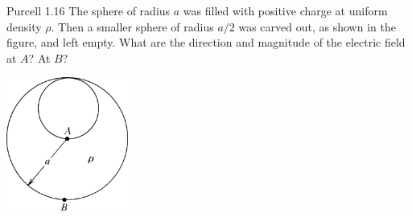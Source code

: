 \documentclass{esg8022pset}
\begin{document}

\begin{problem}{Purcell 1.16}
  The sphere of radius $a$ was filled with positive charge at uniform density $\rho$. Then a smaller sphere of radius $a/2$ was carved out, as shown in the figure, and left empty. What are the direction and magnitude of the electric field at $A$? At $B$?
  \begin{center}\includegraphics[width=0.3\textwidth]{ps02_1}\end{center}
\end{problem}
\end{document}
